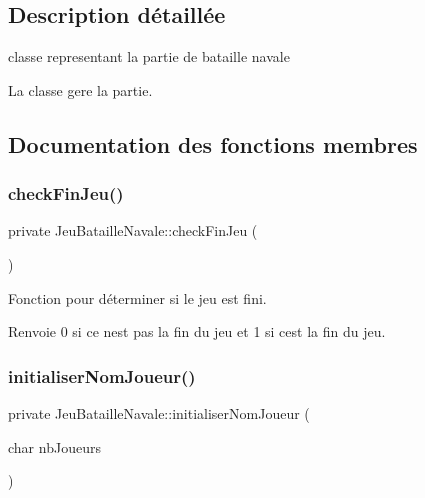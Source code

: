 \subsection{Description détaillée}
classe representant la partie de bataille navale 

La classe gere la partie. 

\subsection{Documentation des fonctions membres}
\mbox{\label{class_jeu_bataille_navale_ad23d49de0aee0b1b182c96a22cb42ffb}} 
\subsubsection{\texorpdfstring{check\+Fin\+Jeu()}{checkFinJeu()}}
{\footnotesize\ttfamily private Jeu\+Bataille\+Navale\+::check\+Fin\+Jeu (\begin{DoxyParamCaption}{ }\end{DoxyParamCaption})\hspace{0.3cm}{\ttfamily [private]}}



Fonction pour déterminer si le jeu est fini. 

\begin{DoxyReturn}{Renvoie}
0 si ce n\textquotesingle{}est pas la fin du jeu et 1 si c\textquotesingle{}est la fin du jeu. 
\end{DoxyReturn}
\mbox{\label{class_jeu_bataille_navale_a72a08bdbc3562a7e1ea38dc1b3b935a2}} 
\subsubsection{\texorpdfstring{initialiser\+Nom\+Joueur()}{initialiserNomJoueur()}}
{\footnotesize\ttfamily private Jeu\+Bataille\+Navale\+::initialiser\+Nom\+Joueur (\begin{DoxyParamCaption}\item[{char}]{nb\+Joueurs }\end{DoxyParamCaption})\hspace{0.3cm}{\ttfamily [private]}}



